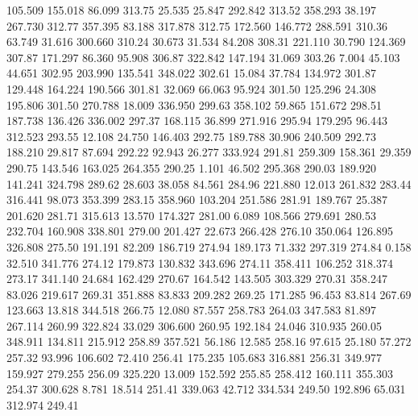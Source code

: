  105.509  155.018   86.099       313.75
  25.535   25.847  292.842       313.52
 358.293   38.197  267.730       312.77
 357.395   83.188  317.878       312.75
 172.560  146.772  288.591       310.36
  63.749   31.616  300.660       310.24
  30.673   31.534   84.208       308.31
 221.110   30.790  124.369       307.87
 171.297   86.360   95.908       306.87
 322.842  147.194   31.069       303.26
   7.004   45.103   44.651       302.95
 203.990  135.541  348.022       302.61
  15.084   37.784  134.972       301.87
 129.448  164.224  190.566       301.81
  32.069   66.063   95.924       301.50
 125.296   24.308  195.806       301.50
 270.788   18.009  336.950       299.63
 358.102   59.865  151.672       298.51
 187.738  136.426  336.002       297.37
 168.115   36.899  271.916       295.94
 179.295   96.443  312.523       293.55
  12.108   24.750  146.403       292.75
 189.788   30.906  240.509       292.73
 188.210   29.817   87.694       292.22
  92.943   26.277  333.924       291.81
 259.309  158.361   29.359       290.75
 143.546  163.025  264.355       290.25
   1.101   46.502  295.368       290.03
 189.920  141.241  324.798       289.62
  28.603   38.058   84.561       284.96
 221.880   12.013  261.832       283.44
 316.441   98.073  353.399       283.15
 358.960  103.204  251.586       281.91
 189.767   25.387  201.620       281.71
 315.613   13.570  174.327       281.00
   6.089  108.566  279.691       280.53
 232.704  160.908  338.801       279.00
 201.427   22.673  266.428       276.10
 350.064  126.895  326.808       275.50
 191.191   82.209  186.719       274.94
 189.173   71.332  297.319       274.84
   0.158   32.510  341.776       274.12
 179.873  130.832  343.696       274.11
 358.411  106.252  318.374       273.17
 341.140   24.684  162.429       270.67
 164.542  143.505  303.329       270.31
 358.247   83.026  219.617       269.31
 351.888   83.833  209.282       269.25
 171.285   96.453   83.814       267.69
 123.663   13.818  344.518       266.75
  12.080   87.557  258.783       264.03
 347.583   81.897  267.114       260.99
 322.824   33.029  306.600       260.95
 192.184   24.046  310.935       260.05
 348.911  134.811  215.912       258.89
 357.521   56.186   12.585       258.16
  97.615   25.180   57.272       257.32
  93.996  106.602   72.410       256.41
 175.235  105.683  316.881       256.31
 349.977  159.927  279.255       256.09
 325.220   13.009  152.592       255.85
 258.412  160.111  355.303       254.37
 300.628    8.781   18.514       251.41
 339.063   42.712  334.534       249.50
 192.896   65.031  312.974       249.41
